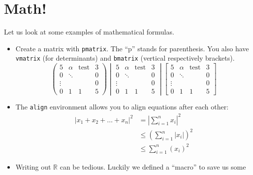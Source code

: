\documentclass{article}
\theoremstyle{plain}
\theoremstyle{definition}
\theoremstyle{remark}
\begin{document}
\section{Math!}

Let us look at some examples of mathematical formulas.
\begin{itemize}
	\item Create a matrix with \texttt{pmatrix}. The ``p'' stands for parenthesis. You also have
	      \texttt{vmatrix} (for determinants) and \texttt{bmatrix} (vertical respectively
	      brackets).
	      \begin{equation*}
		      \begin{pmatrix}
			      5      & \alpha & \text{test} & 3 \\
			      0      & \ddots &             & 0 \\
			      \vdots &        &             & 0 \\
			      0      & 1      & 1           & 5
		      \end{pmatrix}
		      \begin{vmatrix}
			      5      & \alpha & \text{test} & 3 \\
			      0      & \ddots &             & 0 \\
			      \vdots &        &             & 0 \\
			      0      & 1      & 1           & 5
		      \end{vmatrix}
		      \begin{bmatrix}
			      5      & \alpha & \text{test} & 3 \\
			      0      & \ddots &             & 0 \\
			      \vdots &        &             & 0 \\
			      0      & 1      & 1           & 5
		      \end{bmatrix}
	      \end{equation*}
	\item The \texttt{align} environment allows you to align equations after each other:
	      \begin{align*}
		      |x_1+x_2+\dots +x_n|^2 & = |\sum_{i=1}^{n}x_i|^2      \\
		                             & \leq (\sum_{i=1}^{n}|x_i|)^2 \\
		                             & \leq \sum_{i=1}^n(x_i)^2
	      \end{align*}
	\item Writing out $\mathbb{R}$ can be tedious. Luckily we defined a ``macro'' to save us some

\end{itemize}
\end{document}
